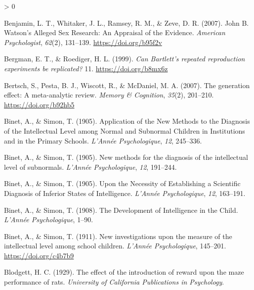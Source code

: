 \documentclass[
  oneside,
  12pt]{crumpbook}
\newlength{\cslhangindent}
\newenvironment{CSLReferences}[2] %
 {%
  \setlength{\parindent}{0pt}
  \ifodd #1 \everypar{\setlength{\hangindent}{\cslhangindent}}\ignorespaces\fi
  \ifnum #2 > 0
  \setlength{\parskip}{#2\baselineskip}
  \fi
 }%
 {}
\begin{document}
\begin{CSLReferences}{1}{0}
\leavevmode\hypertarget{ref-benjaminJohnWatsonAlleged2007}{}%
Benjamin, L. T., Whitaker, J. L., Ramsey, R. M., \& Zeve, D. R. (2007). John {B}. {Watson}'s {Alleged Sex Research}: {An Appraisal} of the {Evidence}. \emph{American Psychologist}, \emph{62}(2), 131--139. \url{https://doi.org/b95f2v}

\leavevmode\hypertarget{ref-bergmanCanBartlettRepeated1999}{}%
Bergman, E. T., \& Roediger, H. L. (1999). \emph{Can {Bartlett}'s repeated reproduction experiments be replicated?} 11. \url{https://doi.org/b8mx6z}

\leavevmode\hypertarget{ref-bertschGenerationEffectMetaanalytic2007}{}%
Bertsch, S., Pesta, B. J., Wiscott, R., \& McDaniel, M. A. (2007). The generation effect: {A} meta-analytic review. \emph{Memory \& Cognition}, \emph{35}(2), 201--210. \url{https://doi.org/b92hb5}

\leavevmode\hypertarget{ref-binetApplicationNewMethods1905}{}%
Binet, A., \& Simon, T. (1905). Application of the {New Methods} to the {Diagnosis} of the {Intellectual Level} among {Normal} and {Subnormal Children} in {Institutions} and in the {Primary Schools}. \emph{L'Année Psychologique}, \emph{12}, 245--336.

\leavevmode\hypertarget{ref-binetNewMethodsDiagnosis1905}{}%
Binet, A., \& Simon, T. (1905). New methods for the diagnosis of the intellectual level of subnormals. \emph{L'Année Psychologique}, \emph{12}, 191--244.

\leavevmode\hypertarget{ref-binetNecessityEstablishingScientific1905}{}%
Binet, A., \& Simon, T. (1905). Upon the {Necessity} of {Establishing} a {Scientific Diagnosis} of {Inferior States} of {Intelligence}. \emph{L'Année Psychologique}, \emph{12}, 163--191.

\leavevmode\hypertarget{ref-binetDevelopmentIntelligenceChild1908}{}%
Binet, A., \& Simon, T. (1908). The {Development} of {Intelligence} in the {Child}. \emph{L'Année Psychologique}, 1--90.

\leavevmode\hypertarget{ref-binetNewInvestigationsMeasure1911}{}%
Binet, A., \& Simon, T. (1911). New investigations upon the measure of the intellectual level among school children. \emph{L'Année Psychologique}, 145--201. \url{https://doi.org/c4b7b9}

\leavevmode\hypertarget{ref-blodgettEffectIntroductionReward1929}{}%
Blodgett, H. C. (1929). The effect of the introduction of reward upon the maze performance of rats. \emph{University of California Publications in Psychology}.


\end{CSLReferences}
\end{document}
